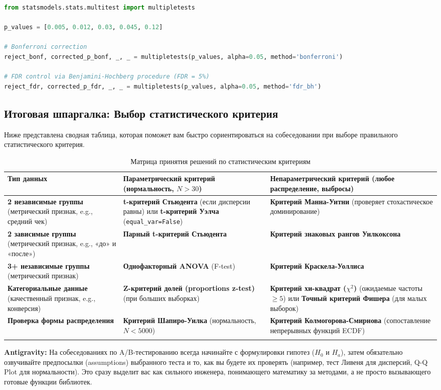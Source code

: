 \documentclass[12pt]{article}
\newcommand{\antigravity}[1]{{\small\color{antigravityblue}\textbf{Antigravity:} #1}}
\begin{document}
\begin{lstlisting}[language=Python, caption={Коррекция множественного тестирования}]
from statsmodels.stats.multitest import multipletests

p_values = [0.005, 0.012, 0.03, 0.045, 0.12]

# Bonferroni correction
reject_bonf, corrected_p_bonf, _, _ = multipletests(p_values, alpha=0.05, method='bonferroni')

# FDR control via Benjamini-Hochberg procedure (FDR = 5%)
reject_fdr, corrected_p_fdr, _, _ = multipletests(p_values, alpha=0.05, method='fdr_bh')
\end{lstlisting}

\newpage

\subsection{Итоговая шпаргалка: Выбор статистического критерия}

Ниже представлена сводная таблица, которая поможет вам быстро сориентироваться на собеседовании при выборе правильного статистического критерия.

\begin{longtable}{p{}p{}p{}}
\toprule
\textbf{Тип данных} & \textbf{Параметрический критерий (нормальность, $N > 30$)} & \textbf{Непараметрический критерий (любое распределение, выбросы)} \\ \midrule
\textbf{2 независимые группы} (метрический признак, e.g., средний чек) & \textbf{t-критерий Стьюдента} (если дисперсии равны) или \textbf{t-критерий Уэлча} (\texttt{equal\_var=False}) & \textbf{Критерий Манна-Уитни} (проверяет стохастическое доминирование) \\ \midrule
\textbf{2 зависимые группы} (метрический признак, e.g., «до» и «после») & \textbf{Парный t-критерий Стьюдента} & \textbf{Критерий знаковых рангов Уилкоксона} \\ \midrule
\textbf{3+ независимые группы} (метрический признак) & \textbf{Однофакторный ANOVA} (F-test) & \textbf{Критерий Краскела-Уоллиса} \\ \midrule
\textbf{Категориальные данные} (качественный признак, e.g., конверсия) & \textbf{Z-критерий долей (proportions z-test)} (при больших выборках) & \textbf{Критерий хи-квадрат ($\chi^2$)} (ожидаемые частоты $\ge 5$) или \textbf{Точный критерий Фишера} (для малых выборок) \\ \midrule
\textbf{Проверка формы распределения} & \textbf{Критерий Шапиро-Уилка} (нормальность, $N < 5000$) & \textbf{Критерий Колмогорова-Смирнова} (сопоставление непрерывных функций ECDF) \\ \bottomrule
\caption{Матрица принятия решений по статистическим критериям}
\end{longtable}

\antigravity{На собеседованиях по A/B-тестированию всегда начинайте с формулировки гипотез ($H_0$ и $H_a$), затем обязательно озвучивайте предпосылки (assumptions) выбранного теста и то, как вы будете их проверять (например, тест Ливеня для дисперсий, Q-Q Plot для нормальности). Это сразу выделит вас как сильного инженера, понимающего математику за методами, а не просто вызывающего готовые функции библиотек.}
\end{document}
